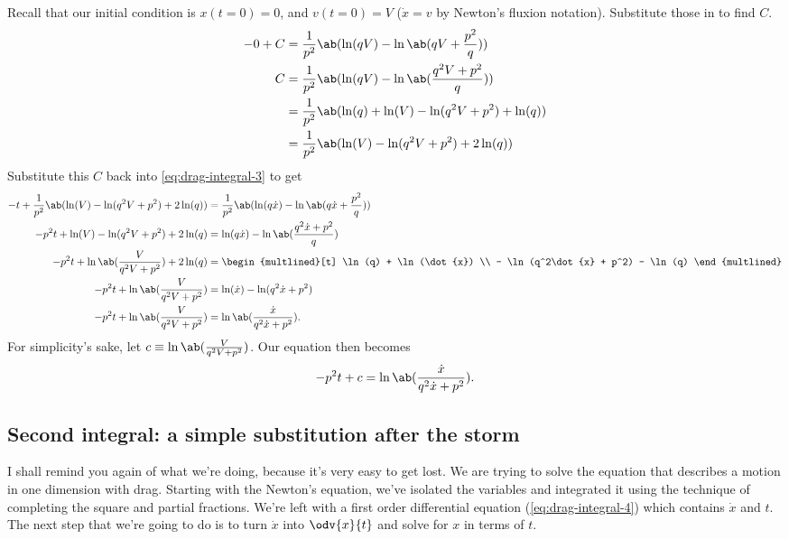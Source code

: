 Recall that our initial condition is $x(t = 0) = 0$, and $v(t = 0) = V$ ($\dot{x} = v$ by Newton's fluxion notation). Substitute those in to find $C$.
\begin{align}
	- 0 + C & = \frac{1}{p^2}\ab(\ln(qV) - \ln\ab(qV + \frac{p^2}{q}))       \\
	C       & = \frac{1}{p^2}\ab(\ln(qV) - \ln\ab(\frac{q^2V + p^2}{q}))     \\
	        & = \frac{1}{p^2}\ab(\ln(q) + \ln(V) - \ln(q^2V + p^2) + \ln(q)) \\
	        & = \frac{1}{p^2}\ab(\ln(V) - \ln(q^2V + p^2) + 2\ln(q))
\end{align}
Substitute this $C$ back into \cref{eq:drag-integral-3} to get
\begin{align}
	-t + \frac{1}{p^2}\ab(\ln(V) - \ln(q^2V + p^2) + 2\ln(q)) & = \frac{1}{p^2}\ab(\ln(q\dot{x}) - \ln\ab(q\dot{x} + \frac{p^2}{q})) \nonumber \\
	-p^2t + \ln(V) - \ln(q^2V + p^2) + 2\ln(q)                & = \ln(q\dot{x}) - \ln\ab(\frac{q^2\dot{x} + p^2}{q}) \nonumber                 \\
	-p^2t + \ln\ab(\frac{V}{q^2V + p^2}) + 2\ln(q)            & =
	\begin{multlined}[t]
		\ln(q) + \ln(\dot{x}) \\
		- \ln(q^2\dot{x} + p^2) - \ln(q)
	\end{multlined} \nonumber                                                                                                            \\
	-p^2t + \ln\ab(\frac{V}{q^2V + p^2})                      & = \ln(\dot{x}) - \ln(q^2\dot{x} + p^2)                                         \\
	-p^2t + \ln\ab(\frac{V}{q^2V + p^2})                      & = \ln\ab(\frac{\dot{x}}{q^2\dot{x} + p^2}).
\end{align}
For simplicity's sake, let $c \equiv \ln\ab(\frac{V}{q^2V + p^2})$. Our equation then becomes
\begin{equation}
	-p^2t + c = \ln\ab(\frac{\dot{x}}{q^2\dot{x} + p^2}). \label{eq:drag-integral-4}
\end{equation}

\subsection{Second integral: a simple substitution after the storm}

I shall remind you again of what we're doing, because it's very easy to get lost. We are trying to solve the equation that describes a motion in one dimension with drag. Starting with the Newton's equation, we've isolated the variables and integrated it using the technique of completing the square and partial fractions. We're left with a first order differential equation (\cref{eq:drag-integral-4}) which contains $\dot{x}$ and $t$. The next step that we're going to do is to turn $\dot{x}$ into $\odv{x}{t}$ and solve for $x$ in terms of $t$.


